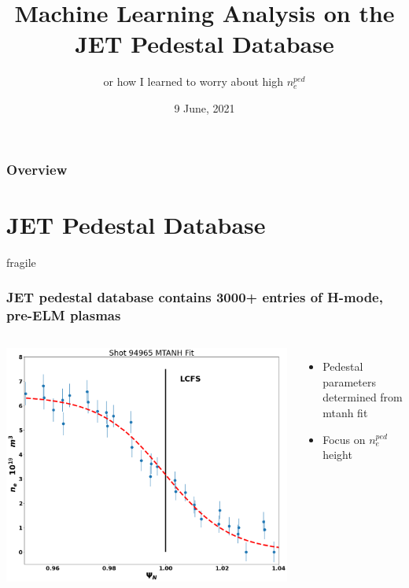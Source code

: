 \documentclass{beamer}
\title{Machine Learning Analysis on the JET Pedestal Database}
\subtitle{or how I learned to worry about high  $n_e^{ped}$}
\date{9 June, 2021}
\begin{document}
\frame{\titlepage}


\begin{frame}
	\frametitle{Overview}
	\tableofcontents
\end{frame}

\section{JET Pedestal Database}
\begin{frame}{fragile}
\frametitle{JET pedestal database contains 3000+ entries of H-mode, pre-ELM plasmas}
\begin{columns}

\includegraphics[scale=0.2]{./src/MTANH_fit_21}\hfill
{}
\begin{itemize}
	\item Pedestal parameters determined from mtanh fit
	\item Focus on $n_e^{ped}$ height
\end{itemize}
\end{columns}

\end{frame}
\end{document}
